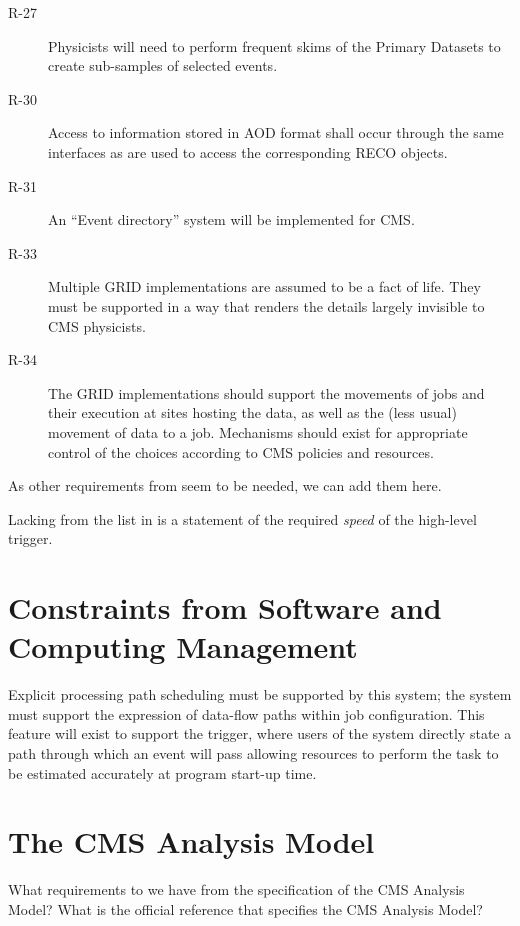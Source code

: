 \documentclass[draftmode]{memarticle}
\begin{document}
\begin{description}
\item[R-27]
Physicists will need to perform frequent skims of the Primary Datasets
to create sub-samples of selected events.

\item[R-30]
Access to information stored in AOD format
shall occur through the same interfaces
as are used to access the corresponding RECO objects.

\item[R-31]
An ``Event directory'' system will be implemented for CMS.

\item[R-33]
Multiple GRID implementations are assumed to be a fact of life.
They must be supported in a way that renders the details largely invisible
to CMS physicists.

\item[R-34]
The GRID implementations should support
the movements of jobs
and their execution at sites hosting the data,
as well as the (less usual)
movement of data to a job.
Mechanisms should exist for appropriate control
of the choices according to CMS policies and resources.

\end{description}

\begin{fixme}
As other requirements from \cite{CMSCM} seem to be needed,
we can add them here.
\end{fixme}


Lacking from the list in \cite{CMSCM}
is a statement of the required \emph{speed}
of the high-level trigger.

\section{Constraints from Software and Computing Management}

Explicit processing path scheduling must be supported by this system;
the system must support the expression of data-flow paths within
job configuration. This feature will exist to support the trigger,
where users of the system directly state a path through which an
event will pass allowing resources to perform the task to be
estimated accurately at program start-up time.

\section{The CMS Analysis Model}

\begin{fixme}
What requirements to we have from the specification of the CMS Analysis Model?
What is the official reference that specifies the CMS Analysis Model?
\end{fixme}
\end{document}
